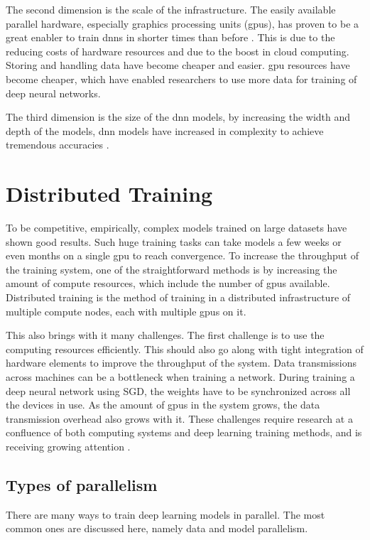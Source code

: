 The second dimension is the scale of the infrastructure. The easily available parallel hardware, especially graphics processing units (\acrshort{gpu}s), has proven to be a great enabler to train \acrshort{dnn}s in shorter times than before \cite{Zhang2017Poseidon:Clusters}. This is due to the reducing costs of hardware resources and due to the boost in cloud computing. Storing and handling data have become cheaper and easier. \acrshort{gpu} resources have become cheaper, which have enabled researchers to use more data for training of deep neural networks. 

The third dimension is the size of the \acrshort{dnn} models, by increasing the width and depth of the models, \acrshort{dnn} models have increased in complexity to achieve tremendous accuracies \cite{Dean2012LargeNetworks}. 

\section{Distributed Training}
To be competitive, empirically, complex models trained on large datasets have shown good results. Such huge training tasks can take models a few weeks or even months on a single \acrshort{gpu} to reach convergence. To increase the throughput of the training system, one of the straightforward  methods is by increasing the amount of compute resources, which include the number of \acrshort{gpu}s available. Distributed training is the method of training in a distributed infrastructure of multiple compute nodes, each with multiple \acrshort{gpu}s on it\cite{Langer2020DistributedPerspective}. 

This also brings with it many challenges. The first challenge is to use the computing resources efficiently. This should also go along with tight integration of hardware elements to improve the throughput of the system. Data transmissions across machines can be a bottleneck when training a network. During training a deep neural network using SGD, the weights have to be synchronized across all the devices in use. As the amount of \acrshort{gpu}s in the system grows, the data transmission overhead also grows with it. These challenges require research at a confluence of both computing systems and deep learning training methods, and is receiving growing attention \cite{Xiao2018Gandiva:Learning, Mai2020KungFu:Adaptive, Chilimbi2014ProjectSystem, Cui2016GeePS:Server, Peng2018Optimus:Clusters}.

\subsection{Types of parallelism}
There are many ways to train deep learning models in parallel. The most common ones are discussed here, namely data and model parallelism.

